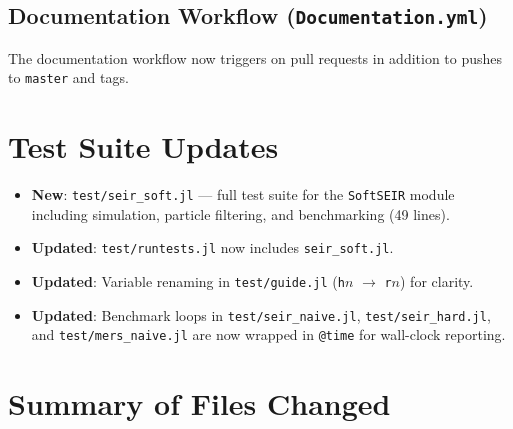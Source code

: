 \documentclass[11pt,letterpaper]{article}
\begin{document}
\subsection{Documentation Workflow (\texttt{Documentation.yml})}

The documentation workflow now triggers on pull requests in addition to
pushes to \texttt{master} and tags.

\section{Test Suite Updates}

\begin{itemize}
  \item \textbf{New}: \texttt{test/seir\_soft.jl} --- full test suite
        for the \texttt{SoftSEIR} module including simulation,
        particle filtering, and benchmarking (49 lines).
  \item \textbf{Updated}: \texttt{test/runtests.jl} now includes
        \texttt{seir\_soft.jl}.
  \item \textbf{Updated}: Variable renaming in \texttt{test/guide.jl}
        (\texttt{h$n$} $\to$ \texttt{r$n$}) for clarity.
  \item \textbf{Updated}: Benchmark loops in
        \texttt{test/seir\_naive.jl}, \texttt{test/seir\_hard.jl}, and
        \texttt{test/mers\_naive.jl} are now wrapped in \texttt{@time}
        for wall-clock reporting.
\end{itemize}

\section{Summary of Files Changed}
\end{document}
